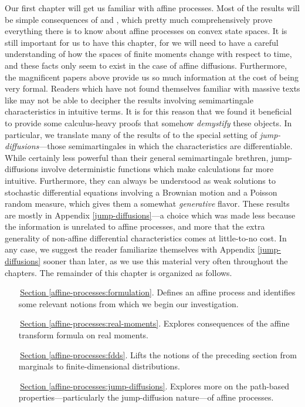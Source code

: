 Our first chapter will get us familiar with affine processes.
Most of the results will be simple consequences of \cite{cuchiero2011} and \cite{keller2015}, which pretty much comprehensively prove everything there is to know about affine processes on convex state spaces.
It is still important for us to have this chapter, for we will need to have a careful understanding of how the spaces of finite moments change with respect to time, and these facts only seem to exist in the case of affine diffusions.
Furthermore, the magnificent papers above provide us so much information at the cost of being very formal.
Readers which have not found themselves familiar with massive texts like \cite{jacod2003} may not be able to decipher the results involving semimartingale characteristics in intuitive terms.
It is for this reason that we found it beneficial to provide some calculus-heavy proofs that somehow \emph{demystify} these objects.
In particular, we translate many of the results of \cite{jacod2003} to the special setting of \emph{jump-diffusions}---those semimartingales in which the characteristics are differentiable.
While certainly less powerful than their general semimartingale brethren, jump-diffusions involve deterministic functions which make calculations far more intuitive.
Furthermore, they can always be understood as weak solutions to stochastic differential equations involving a Brownian motion and a Poisson random measure, which gives them a somewhat \emph{generative} flavor.
These results are mostly in Appendix \ref{jump-diffusions}---a choice which was made less because the information is unrelated to affine processes, and more that the extra generality of non-affine differential characteristics comes at little-to-no cost.
In any case, we suggest the reader familiarize themselves with Appendix \ref{jump-diffusions} sooner than later, as we use this material very often throughout the chapters.
The remainder of this chapter is organized as follows.

\begin{enumerate}[leftmargin=24mm]
  \item[\,{\hyperref[affine-processes:formulation]{Section }}\ref{affine-processes:formulation}.]
    Defines an affine process and identifies some relevant notions from which we begin our investigation.
  \item[\,{\hyperref[affine-processes:real-moments]{Section }}\ref{affine-processes:real-moments}.]
    Explores consequences of the affine transform formula on real moments.
  \item[\,{\hyperref[affine-processes:fdds]{Section }}\ref{affine-processes:fdds}.]
    Lifts the notions of the preceding section from marginals to finite-dimensional distributions.
  \item[\,{\hyperref[affine-processes:jump-diffusions]{Section }}\ref{affine-processes:jump-diffusions}.]
    Explores more on the path-based properties---particularly the jump-diffusion nature---of affine processes.
\end{enumerate}
